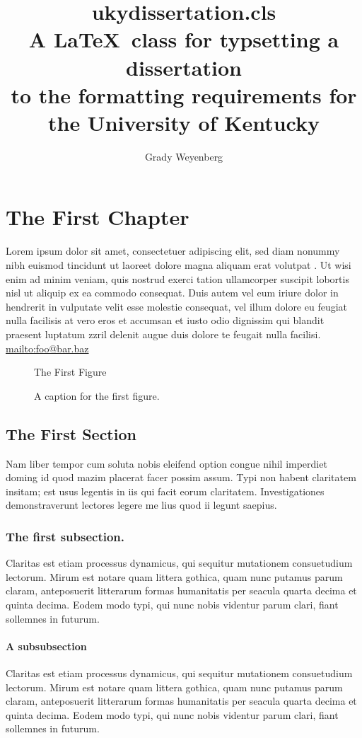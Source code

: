 \documentclass[12pt,endorse]{ukydissertation}
\title{ukydissertation.cls\protect\\%
  A \LaTeX\ class for typsetting a dissertation\protect\\%
  to the formatting requirements for\protect\\%
  the University of Kentucky%
}
\author{Grady Weyenberg}
\begin{document}
\makefrontmatter



\chapter{The First Chapter}
\label{cha:first-chapter}
Lorem ipsum dolor sit amet, consectetuer adipiscing elit, sed diam
nonummy nibh euismod tincidunt ut laoreet dolore magna aliquam erat
volutpat \citep{weyenberg2014nonparametric}. Ut wisi enim ad minim veniam, quis nostrud exerci tation
ullamcorper suscipit lobortis nisl ut aliquip ex ea commodo
consequat. Duis autem vel eum iriure dolor in hendrerit in vulputate
velit esse molestie consequat, vel illum dolore eu feugiat nulla
facilisis at vero eros et accumsan et iusto odio dignissim qui blandit
praesent luptatum zzril delenit augue duis dolore te feugait nulla
facilisi. \url{mailto:foo@bar.baz}
\begin{figure}
  \centering
  The First Figure
  \caption[A name for the ToC]{A caption for the first figure.}
  \label{fig:numberone}
\end{figure}
\section{The First Section}
\label{sec:first-section}

Nam liber tempor cum soluta nobis eleifend option congue
nihil imperdiet doming id quod mazim placerat facer possim assum. Typi
non habent claritatem insitam; est usus legentis in iis qui facit
eorum claritatem. Investigationes demonstraverunt lectores legere me
lius quod ii legunt saepius.
\subsection{The first subsection.}
\label{sec:first-subsection}

Claritas est etiam processus dynamicus,
qui sequitur mutationem consuetudium lectorum. Mirum est notare quam
littera gothica, quam nunc putamus parum claram, anteposuerit
litterarum formas humanitatis per seacula quarta decima et quinta
decima. Eodem modo typi, qui nunc nobis videntur parum clari, fiant
sollemnes in futurum.

\subsubsection{A subsubsection}

Claritas est etiam processus dynamicus,
qui sequitur mutationem consuetudium lectorum. Mirum est notare quam
littera gothica, quam nunc putamus parum claram, anteposuerit
litterarum formas humanitatis per seacula quarta decima et quinta
decima. Eodem modo typi, qui nunc nobis videntur parum clari, fiant
sollemnes in futurum.
\end{document}
